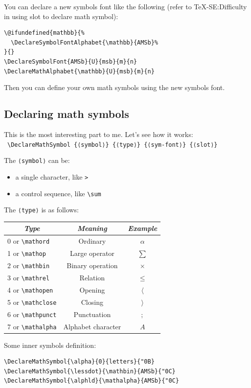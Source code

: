 \documentclass{article}
\begin{document}
You can declare a new symbols font like the following (refer to TeX-SE:Difficulty in using slot to declare math symbol):
\begin{verbatim}
\@ifundefined{mathbb}{%
  \DeclareSymbolFontAlphabet{\mathbb}{AMSb}%
}{}
\DeclareSymbolFont{AMSb}{U}{msb}{m}{n}
\DeclareMathAlphabet{\mathbb}{U}{msb}{m}{n}
\end{verbatim}

Then you can define your own math symbols using the new symbols font.

\subsection{Declaring math symbols}
This is the most interesting part to me. Let's see how it works:\\
\textbullet\ \verb|\DeclareMathSymbol {⟨symbol⟩} {⟨type⟩} {⟨sym-font⟩} {⟨slot⟩}|

The \verb|⟨symbol⟩| can be:
\begin{itemize}
  \item a single character, like \verb|>|
  \item a control sequence, like \verb|\sum|
\end{itemize}

The \verb|⟨type⟩| is as follows:
\begin{center}
  \begin{tabular}{ccc}
    \hline
    \emph{Type} & \emph{Meaning} & \emph{Example} \\[.5em]
    \hline
    0 or \verb|\mathord  | & Ordinary           & $\alpha$ \\[.5em]
    1 or \verb|\mathop   | & Large operator     & $\sum$ \\[.5em]
    2 or \verb|\mathbin  | & Binary operation   & $\times$ \\[.5em]
    3 or \verb|\mathrel  | & Relation           & $\leq$ \\[.5em]
    4 or \verb|\mathopen | & Opening            & $\langle$ \\[.5em]
    5 or \verb|\mathclose| & Closing            & $\rangle$ \\[.5em]
    6 or \verb|\mathpunct| & Punctuation        & $;$ \\[.5em]
    7 or \verb|\mathalpha| & Alphabet character & $A$ \\[.5em]
    \hline
  \end{tabular}
\end{center}

Some inner symbols definition:
\begin{verbatim}
\DeclareMathSymbol{\alpha}{0}{letters}{"0B}
\DeclareMathSymbol{\lessdot}{\mathbin}{AMSb}{"0C}
\DeclareMathSymbol{\alphld}{\mathalpha}{AMSb}{"0C}
\end{verbatim}
\end{document}
